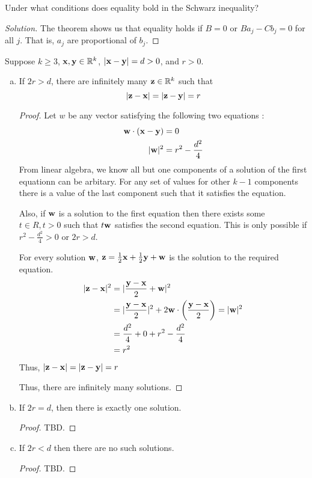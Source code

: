 \begin{prblm}
	Under what conditions does equality bold in the Schwarz inequality?
	\begin{proof}[Solution]
		The theorem shows us that equality holds if $B = 0$
		or $Ba_j - Cb_j = 0$ for all $j$. That is, $a_j$ are proportional of $b_j$.
	\end{proof}
\end{prblm}

\begin{prblm}
	Suppose $k \geq 3$, ${\bf x, y} \in \mathbb{R}^k$, $|{\bf x-y}| = d > 0$, and $r > 0$.
	\begin{enumerate}[a)]
		\item If $2r > d$, there are infinitely many ${\bf z} \in \mathbb{R}^k$ such that
		$$ |{\bf z - x}| = |{\bf z - y}| = r $$
		\begin{proof}
			Let $w$ be any vector satisfying the following two equations :
			\begin{align*}
				{\bf w} \cdot ({\bf x - y}) & = 0 \\
				|{\bf w}|^2 & = r^2 - \frac{d^2}{4}
			\end{align*}
			From linear algebra, we know all but one components of a solution
			of the first equationn can be arbitary. 
			For any set of values for other $k-1$ components there is a value of the last component
			such that it satisfies the equation.

			Also, if ${\bf w}$ is a solution to the first equation then there exists some $t \in R, t > 0$ 
			such that $t{\bf w}$ satisfies the second equation.
			This is only possible if $r^2 - \frac{d^2}{4} > 0$ or $2r > d$.

			For every solution ${\bf w}$, ${\bf z} = \frac{1}{2} {\bf x} + \frac{1}{2} {\bf y} + {\bf w}$ is the solution to the required equation.
			\begin{align*}
				|{\bf z - x}|^2 
					& = |\frac{\bf y - x}{2} + {\bf w}|^2 \\
					& = |\frac{\bf y - x}{2}|^2 + 2 {\bf w} \cdot \left( \frac{\bf y - x}{2} \right) = |{\bf w}|^2 \\
					& = \frac{d^2}{4} + 0 + r^2 - \frac{d^2}{4} \\
					& = r^2
			\end{align*}
			Thus, $|{\bf z - x}| = |{\bf z - y}| = r$

			Thus, there are infinitely many solutions.
		\end{proof}

		\item If $2r = d$, then there is exactly one solution.
		\begin{proof}
			TBD.
		\end{proof}

		\item If $2r < d$ then there are no such solutions.
		\begin{proof}
			TBD.
		\end{proof}
	\end{enumerate}
\end{prblm}


